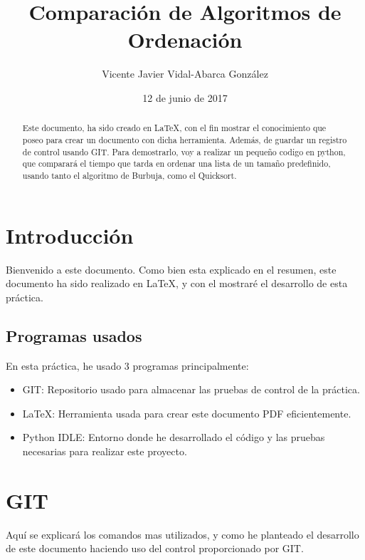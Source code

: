 \documentclass[a4,12pt]{article}
\title{Comparación de Algoritmos de Ordenación}
\author{Vicente Javier Vidal-Abarca González}
\date{12 de junio de 2017}
\begin{document}
\maketitle

\begin{abstract}

Este documento, ha sido creado en \LaTeX, con el fin mostrar el conocimiento que poseo para crear un documento con dicha herramienta. Además, de guardar un registro de control usando GIT. Para demostrarlo, voy a realizar un pequeño codigo en python, que comparará el tiempo que tarda en ordenar una lista de un tamaño predefinido, usando tanto el algoritmo de Burbuja, como el Quicksort.

\end{abstract}

\newpage
\tableofcontents
\newpage

\section{Introducción}
Bienvenido a este documento. Como bien esta explicado en el resumen, este documento ha sido realizado en \LaTeX, y con el mostraré el desarrollo de esta práctica.

\subsection{Programas usados}
En esta práctica, he usado 3 programas principalmente:
\begin{itemize}

\item GIT: Repositorio usado para almacenar las pruebas de control de la práctica.

\item \LaTeX: Herramienta usada para crear este documento PDF eficientemente.

\item Python IDLE: Entorno donde he desarrollado el código y las pruebas necesarias para realizar este proyecto.

\end{itemize}

\newpage
\section{GIT}
Aquí se explicará los comandos mas utilizados, y como he planteado el desarrollo de este documento haciendo uso del control proporcionado por GIT.
\end{document}
